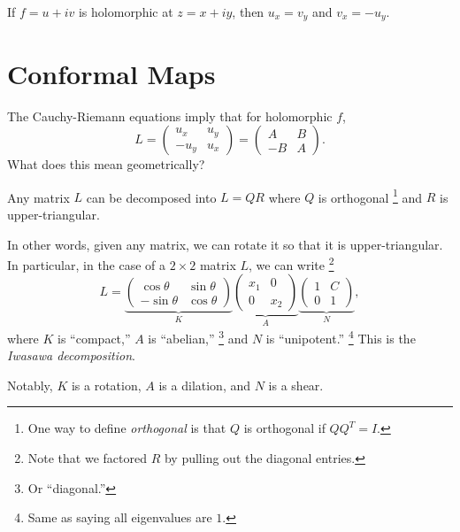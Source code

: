 \begin{tcolorbox}[title=Theorem (Cauchy-Riemann equations)]
  If $f = u + iv$ is holomorphic at $z = x + iy$, then
  $u_x = v_y$ and $v_x = -u_y$.
\end{tcolorbox}

\section{Conformal Maps}
The Cauchy-Riemann equations imply that for holomorphic
$f$,
\[
L =
\left(\begin{matrix}
  u_x & u_y \\
  -u_y & u_x
\end{matrix}\right) =
\left(\begin{matrix}
    A & B \\
    -B & A
\end{matrix}\right)
.\]
What does this mean geometrically?

\begin{tcolorbox}[title=Theorem ($QR$ decomposition)]
  Any matrix $L$ can be decomposed into $L = QR$ where
  $Q$ is orthogonal
  \footnote{One way to define \textit{orthogonal} is that
    $Q$ is orthogonal if $QQ^T = I$.}
  and $R$ is upper-triangular.
\end{tcolorbox}

In other words, given any matrix, we can rotate it so that
it is upper-triangular. In particular, in the case of a
$2 \times 2$ matrix $L$, we can write
\footnote{Note that we factored $R$ by pulling out the
diagonal entries.}
\[
L =
\underbrace{\left(\begin{matrix}
    \cos \theta & \sin \theta \\
    -\sin \theta & \cos \theta
\end{matrix}\right)}_{K}
\underbrace{\left(\begin{matrix}
    x_1 & 0 \\
    0 & x_2
\end{matrix}\right)}_{A}
\underbrace{\left(\begin{matrix}
    1 & C \\
    0 & 1
\end{matrix}\right)}_{N}
,\]
where $K$ is ``compact,'' $A$ is ``abelian,''
\footnote{Or ``diagonal.''}
and $N$ is ``unipotent.''
\footnote{Same as saying all eigenvalues are $1$.}
This is the \textit{Iwasawa decomposition}.

Notably, $K$ is a rotation, $A$ is a dilation, and $N$
is a shear.

